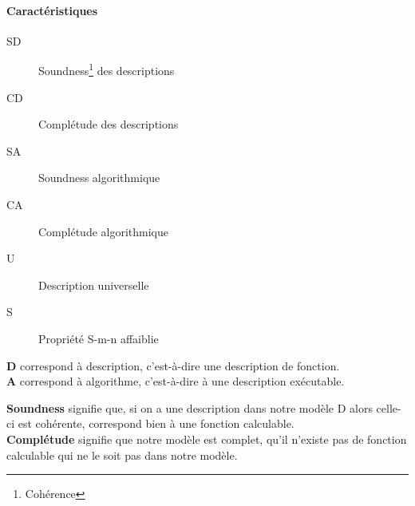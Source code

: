 \paragraph{Caractéristiques} 
\begin{description}
	\item[SD] Soundness\footnote{Cohérence} des descriptions
	\item[CD] Complétude des descriptions
	\item[SA] Soundness algorithmique
	\item[CA] Complétude algorithmique
	\item[U] Description universelle
	\item[S] Propriété S-m-n affaiblie
\end{description}


\begin{myrem}
	\textbf{D} correspond à description, c'est-à-dire une description de fonction.\\
	\textbf{A} correspond à algorithme, c'est-à-dire à une description
	exécutable.
\end{myrem}

\begin{myrem}
	\textbf{Soundness} signifie que, si on a une description dans notre modèle D alors
	celle-ci est cohérente, correspond bien à une fonction
	calculable.\\
	\textbf{Complétude} signifie que notre modèle est complet, qu'il
	n'existe pas de fonction calculable qui ne le soit pas dans notre
	modèle.
\end{myrem}

